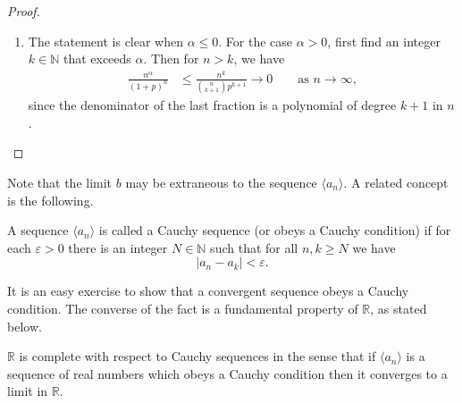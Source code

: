 \begin{proof}
\begin{enumerate}[(1)]
      \item The statement is clear when $\alpha \leqslant 0$. 
	For the case $\alpha > 0$, first find an integer $k \in \mathbb{N}$ that exceeds $\alpha$.
	Then for $n > k$, we have
	\begin{align*}
	  \frac{n^\alpha}{(1+p)^n} &\leqslant \frac{n^k}{\binom{n}{k+1} p^{k+1}} \to 0 \qquad
	  \text{as $n \to \infty$},
	\end{align*}
	since the denominator of the last fraction is a polynomial of degree $k+1$ in $n$.
  \end{enumerate}
\end{proof}

Note that the limit $b$ may be extraneous to the sequence $\langle a_n \rangle$.
A related concept is the following.

\begin{defn}
  A sequence $\langle a_n \rangle$ is called a \textsf{Cauchy sequence} (or obeys a Cauchy condition) if for each $\varepsilon > 0$ there is an integer $N \in \mathbb N$ such that for all $n, k \geqslant N$ we have
  \[
    |a_n - a_k| < \varepsilon.
  \]
\end{defn}

It is an easy exercise to show that a convergent sequence obeys a Cauchy condition.
The converse of the fact is a fundamental property of $\mathbb{R}$, as stated below.

\begin{thm}
  $\mathbb{R}$ is \textsf{complete} with respect to Cauchy sequences in the sense that if $\langle a_n \rangle$ is a sequence of real numbers which obeys a Cauchy condition then it converges to a limit in $\mathbb{R}$.
\end{thm}

